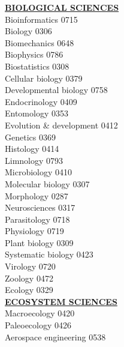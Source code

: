 \documentclass[9pt,twoside]{article}
\newcommand{\categoryheading}[1]{{\fontsize{8}{11}\selectfont \textbf{\uline{#1}}}}
\begin{document}
\begin{multicols}{3}
\categoryheading{BIOLOGICAL SCIENCES} \leavevmode \\
Bioinformatics \hfill 0715 \leavevmode \\
Biology \hfill 0306 \leavevmode \\
Biomechanics \hfill 0648 \leavevmode \\
Biophysics \hfill 0786 \leavevmode \\
Biostatistics \hfill 0308 \leavevmode \\
Cellular biology \hfill 0379 \leavevmode \\
Developmental biology \hfill 0758 \leavevmode \\
Endocrinology \hfill 0409 \leavevmode \\
Entomology \hfill 0353 \leavevmode \\
Evolution \& development \hfill 0412 \leavevmode \\
Genetics \hfill 0369 \leavevmode \\
Histology \hfill 0414 \leavevmode \\
Limnology \hfill 0793 \leavevmode \\
Microbiology \hfill 0410 \leavevmode \\
Molecular biology \hfill 0307 \leavevmode \\
Morphology \hfill 0287 \leavevmode \\
Neurosciences \hfill 0317 \leavevmode \\
Parasitology \hfill 0718 \leavevmode \\
Physiology \hfill 0719 \leavevmode \\
Plant biology \hfill 0309 \leavevmode \\
Systematic biology \hfill 0423 \leavevmode \\
Virology \hfill 0720 \leavevmode \\
Zoology \hfill 0472 \leavevmode \\
Ecology \hfill 0329 \leavevmode \\
\columnbreak
\categoryheading{ECOSYSTEM SCIENCES} \leavevmode \\
Macroecology \hfill 0420 \leavevmode \\
Paleoecology \hfill 0426 \leavevmode \\
Aerospace engineering \hfill 0538


\end{multicols}
\end{document}
